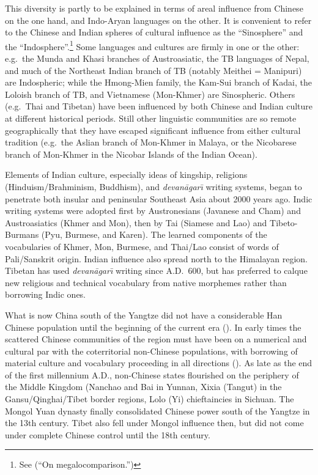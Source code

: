 This diversity is partly to be explained in terms of areal influence from Chinese on the one hand, and Indo-Aryan languages on the other. It is convenient to refer to the Chinese and Indian spheres of cultural influence as the “Sinosphere” and the “Indosphere”.\footnote{See \citealt{JAM-OM} (“On megalocomparison.”)} Some languages and cultures are firmly in one or the other: e.g.\ the Munda and Khasi branches of Austroasiatic, the TB languages of Nepal, and much of the Northeast Indian branch of TB (notably Meithei = Manipuri) are Indospheric; while the Hmong-Mien family, the Kam-Sui branch of Kadai, the Loloish branch of TB, and Vietnamese (Mon-Khmer) are Sinospheric. Others (e.g.\ Thai and Tibetan) have been influenced by both Chinese and Indian culture at different historical periods. Still other linguistic communities are so remote geographically that they have escaped significant influence from either cultural tradition (e.g.\ the Aslian branch of Mon-Khmer in Malaya, or the Nicobarese branch of Mon-Khmer in the Nicobar Islands of the Indian Ocean).

Elements of Indian culture, especially ideas of kingship, religions (Hinduism/Brahminism, Buddhism), and {\it devan\=agar\={\i}} writing systems, began to penetrate both insular and peninsular Southeast Asia about 2000 years ago. Indic writing systems were adopted first by Austronesians (Javanese and Cham) and Austroasiatics (Khmer and Mon), then by Tai (Siamese and Lao) and Tibeto-Burmans (Pyu, Burmese, and Karen). The learned components of the vocabularies of Khmer, Mon, Burmese, and Thai/Lao consist of words of Pali/Sanskrit origin. Indian influence also spread north to the Himalayan region. Tibetan has used {\it devan\=agar\={\i}} writing since A.D.\ 600, but has preferred to calque new religious and technical vocabulary from native morphemes rather than borrowing Indic ones.

What is now China south of the Yangtze did not have a considerable Han Chinese population until the beginning of the current era (\citealt{RR-LOC,JN-Chinese}). In early times the scattered Chinese communities of the region must have been on a numerical and cultural par with the coterritorial non-Chinese populations, with borrowing of material culture and vocabulary proceeding in all directions (\citealt{PKB-ATLC,MN-AASC,LS-CAGR}). As late as the end of the first millennium A.D., non-Chinese states flourished on the periphery of the Middle Kingdom (Nanchao and Bai in Yunnan, Xixia (Tangut) in the Gansu/\allowbreak{}Qinghai/\allowbreak{}Tibet border regions, Lolo (Yi) chieftaincies in Sichuan. The Mongol Yuan dynasty finally consolidated Chinese power south of the Yangtze in the 13th century. Tibet also fell under Mongol influence then, but did not come under complete Chinese control until the 18th century.

